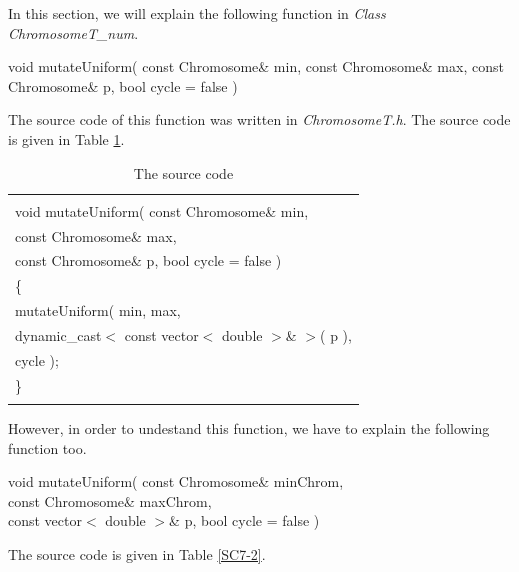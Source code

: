 \documentclass[twocolumn]{article}
\begin{document}
\noindent
In this section, we will explain the following function in {\em Class
ChromosomeT\_num}. 

\begin{center}
void mutateUniform( const Chromosome\& min, const Chromosome\& max,
const Chromosome\& p, bool cycle = false )
\end{center}

\noindent
The source code of this function was written in {\em
ChromosomeT.h}. The source code is given in Table \ref{SC7}.

\begin{table}[h]
\begin{center}
\caption{The source code}
\label{SC7}
{\scriptsize
\begin{tabular}{|l|}\hline
\hspace*{7cm}\\
void mutateUniform( const Chromosome\& min,\\
\hspace*{4mm} const Chromosome\& max,\\
\hspace*{4mm} const Chromosome\& p,  bool cycle = false )\\
\{\\
\hspace*{4mm} mutateUniform( min, max,\\
\hspace*{8mm} dynamic\_cast$<$ const vector$<$ double $>$\& $>$( p ),\\
\hspace*{8mm} cycle );\\
\}\\
\hspace*{7cm}\\\hline
\end{tabular}
}
\end{center}
\end{table}

\noindent
However, in order to undestand this function, we have to explain the
following function too.

\begin{center}
void mutateUniform( const Chromosome\& minChrom,\\
const Chromosome\& maxChrom,\\
const vector$<$ double $>$\& p, bool cycle = false )
\end{center}

\noindent
The source code is given in Table \ref{SC7-2}.
\end{document}

